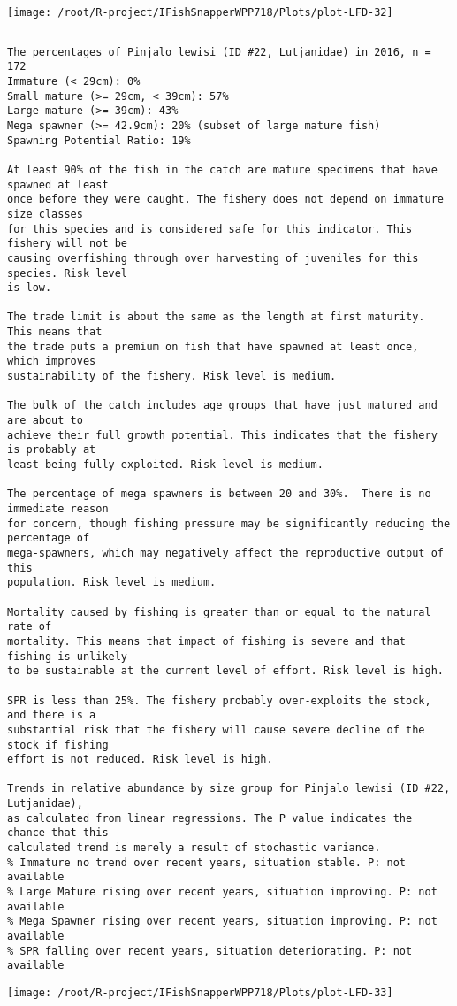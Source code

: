 \documentclass{report}\usepackage[]{graphicx}\usepackage[]{color}
\makeatletter
\def\maxwidth{ %
  \ifdim\Gin@nat@width>\linewidth
    \linewidth
  \else
    \Gin@nat@width
  \fi
}
\newenvironment{kframe}{%
 \def\at@end@of@kframe{}%
 \ifinner\ifhmode%
  \def\at@end@of@kframe{\end{minipage}}%
  \begin{minipage}{\columnwidth}%
 \fi\fi%
 \def\FrameCommand##1{\hskip\@totalleftmargin \hskip-\fboxsep
 \colorbox{shadecolor}{##1}\hskip-\fboxsep
     \hskip-\linewidth \hskip-\@totalleftmargin \hskip\columnwidth}%
 \MakeFramed {\advance\hsize-\width
   \@totalleftmargin\z@ \linewidth\hsize
   \@setminipage}}%
 {\par\unskip\endMakeFramed%
 \at@end@of@kframe}
\newenvironment{knitrout}{}{} %
\makeatother
\begin{document}
\begin{knitrout}
\texttt{[image: /root/R-project/IFishSnapperWPP718/Plots/plot-LFD-32]} 
\begin{kframe}\begin{verbatim}
\end{verbatim}
\end{kframe}
\clearpage
\newpage
\begin{kframe}\begin{verbatim}The percentages of Pinjalo lewisi (ID #22, Lutjanidae) in 2016, n = 172
Immature (< 29cm): 0%
Small mature (>= 29cm, < 39cm): 57%
Large mature (>= 39cm): 43%
Mega spawner (>= 42.9cm): 20% (subset of large mature fish)
Spawning Potential Ratio: 19%
 
At least 90% of the fish in the catch are mature specimens that have spawned at least
once before they were caught. The fishery does not depend on immature size classes
for this species and is considered safe for this indicator. This fishery will not be
causing overfishing through over harvesting of juveniles for this species. Risk level
is low.

The trade limit is about the same as the length at first maturity.  This means that
the trade puts a premium on fish that have spawned at least once, which improves
sustainability of the fishery. Risk level is medium.

The bulk of the catch includes age groups that have just matured and are about to
achieve their full growth potential. This indicates that the fishery is probably at
least being fully exploited. Risk level is medium.

The percentage of mega spawners is between 20 and 30%.  There is no immediate reason
for concern, though fishing pressure may be significantly reducing the percentage of
mega-spawners, which may negatively affect the reproductive output of this
population. Risk level is medium.
 
Mortality caused by fishing is greater than or equal to the natural rate of
mortality. This means that impact of fishing is severe and that fishing is unlikely
to be sustainable at the current level of effort. Risk level is high.
 
SPR is less than 25%. The fishery probably over-exploits the stock, and there is a
substantial risk that the fishery will cause severe decline of the stock if fishing
effort is not reduced. Risk level is high.
 
Trends in relative abundance by size group for Pinjalo lewisi (ID #22, Lutjanidae),
as calculated from linear regressions. The P value indicates the chance that this
calculated trend is merely a result of stochastic variance.
% Immature no trend over recent years, situation stable. P: not available
% Large Mature rising over recent years, situation improving. P: not available
% Mega Spawner rising over recent years, situation improving. P: not available
% SPR falling over recent years, situation deteriorating. P: not available
\end{verbatim}
\end{kframe}
\texttt{[image: /root/R-project/IFishSnapperWPP718/Plots/plot-LFD-33]} 


\end{knitrout}
\end{document}
